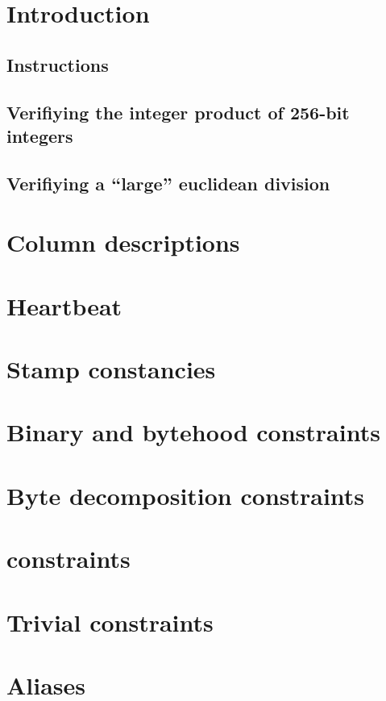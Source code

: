 \section{Introduction} \label{sec: (alu) intro}
\subsection{Instructions} 
\subsection{Verifiying the integer product of 256-bit integers} \label{subsec (alu/ext): integer product of 256-bit integers} 
\subsection{Verifiying a ``large'' euclidean division} \label{subsec (alu/ext): large euclidean divisions} 
\section{Column descriptions} 
\section{Heartbeat} 
\section{Stamp constancies} 
\section{Binary and bytehood constraints} 
\section{Byte decomposition constraints} 
\section{\oli{} constraints} 
\section{Trivial constraints} 
\section{Aliases} 
